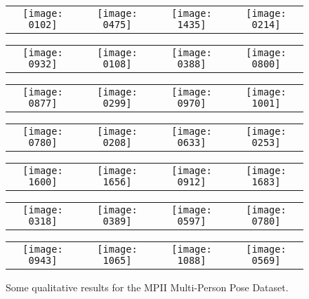 \documentclass[runningheads]{llncs}
\begin{document}
\begin{figure*}
  \centering
  \begin{tabular}{c c c c}
    \texttt{[image: 0102]} &
    \texttt{[image: 0475]} &
    \texttt{[image: 1435]} &
    \texttt{[image: 0214]} \\
  \end{tabular}

  \begin{tabular}{c c c c}
    \texttt{[image: 0932]} &
    \texttt{[image: 0108]} &
    \texttt{[image: 0388]} &
    \texttt{[image: 0800]} \\
  \end{tabular}
\begin{tabular}{c c c c}
    \texttt{[image: 0877]} &
    \texttt{[image: 0299]} &
    \texttt{[image: 0970]} &
    \texttt{[image: 1001]}\\
  \end{tabular}

  \begin{tabular}{c c c c}
    \texttt{[image: 0780]} &
    \texttt{[image: 0208]} &
    \texttt{[image: 0633]} &
    \texttt{[image: 0253]} \\
  \end{tabular}

  \begin{tabular}{c c c c}
    \texttt{[image: 1600]} &
    \texttt{[image: 1656]} &
    \texttt{[image: 0912]} & 
    \texttt{[image: 1683]} \\
  \end{tabular}

  \begin{tabular}{c c c c}
    \texttt{[image: 0318]} &
    \texttt{[image: 0389]} &
    \texttt{[image: 0597]} &
    \texttt{[image: 0780]} \\
  \end{tabular}

  \begin{tabular}{c c c c}
    \texttt{[image: 0943]} &
    \texttt{[image: 1065]} &
    \texttt{[image: 1088]} &
    \texttt{[image: 0569]} \\
  \end{tabular}
  \vspace{-1em}
  \caption{Some qualitative results for the MPII Multi-Person Pose Dataset.}
  \label{fig:qualitative_results}
\end{figure*}
\end{document}
